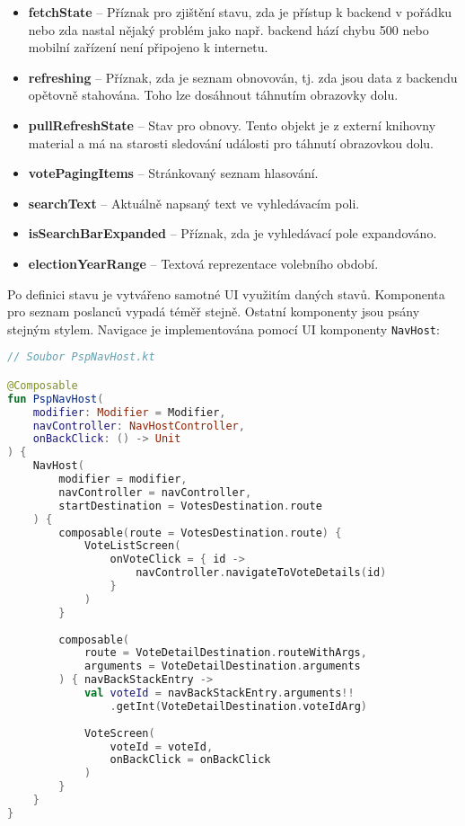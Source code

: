\begin{itemize}
	\item \textbf{fetchState} -- Příznak pro zjištění stavu, zda je přístup k backend v pořádku nebo zda nastal nějaký problém jako např. backend hází chybu 500 nebo mobilní zařízení není připojeno \linebreak k internetu.
	
	\item \textbf{refreshing} -- Příznak, zda je seznam obnovován, tj. zda jsou data z backendu opětovně stahována. Toho lze dosáhnout táhnutím obrazovky dolu.
	
	\item \textbf{pullRefreshState} -- Stav pro obnovy. Tento objekt je z externí knihovny material a má na starosti sledování události pro táhnutí obrazovkou dolu.
	
	\item \textbf{votePagingItems} -- Stránkovaný seznam hlasování.
	
	\item \textbf{searchText} -- Aktuálně napsaný text ve vyhledávacím poli.
	
	\item \textbf{isSearchBarExpanded} -- Příznak, zda je vyhledávací pole expandováno.
	
	\item \textbf{electionYearRange} -- Textová reprezentace volebního období.
\end{itemize}

\noindent Po definici stavu je vytvářeno samotné UI využitím daných stavů. Komponenta pro seznam poslanců vypadá téměř stejně. Ostatní komponenty jsou psány stejným stylem. Navigace je implementována pomocí UI komponenty \lstinline|NavHost|:

\begin{lstlisting}[caption={Komponenta pro navigaci}, tabsize=2, language=Kotlin]
// Soubor PspNavHost.kt

@Composable
fun PspNavHost(
	modifier: Modifier = Modifier,
	navController: NavHostController,
	onBackClick: () -> Unit
) {
	NavHost(
		modifier = modifier,
		navController = navController,
		startDestination = VotesDestination.route
	) {
		composable(route = VotesDestination.route) {
			VoteListScreen(
				onVoteClick = { id ->
					navController.navigateToVoteDetails(id)
				}
			)
		}
	
		composable(
			route = VoteDetailDestination.routeWithArgs,
			arguments = VoteDetailDestination.arguments
		) { navBackStackEntry ->
			val voteId = navBackStackEntry.arguments!!
				.getInt(VoteDetailDestination.voteIdArg)
			
			VoteScreen(
				voteId = voteId,
				onBackClick = onBackClick
			)
		}
	}
}
\end{lstlisting}

